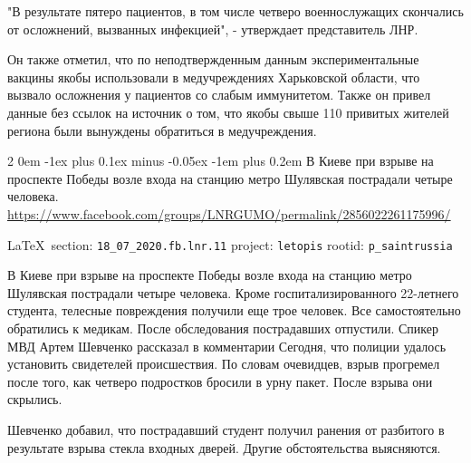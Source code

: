\documentclass[a4paper,11pt]{extreport}
\makeatletter
\renewcommand\subsection{%
  \clearpage
    \@startsection{subsection}%
    {2}%
    {0em}%
    {-1ex plus 0.1ex minus -0.05ex}%
    {-1em plus 0.2em}%
    {\scshape\bfseries\Large}%
}
\makeatother
\begin{document}
"В результате пятеро пациентов, в том числе четверо военнослужащих скончались
от осложнений, вызванных инфекцией", - утверждает представитель ЛНР.

Он также отметил, что по неподтвержденным данным экспериментальные вакцины
якобы использовали в медучреждениях Харьковской области, что вызвало осложнения
у пациентов со слабым иммунитетом. Также он привел данные без ссылок на
источник о том, что якобы свыше 110 привитых жителей региона были вынуждены
обратиться в медучреждения.
 
 
\subsection{В Киеве при взрыве на проспекте Победы возле входа на станцию метро Шулявская пострадали четыре человека.}
\label{sec:18_07_2020.fb.lnr.11}
\url{https://www.facebook.com/groups/LNRGUMO/permalink/2856022261175996/}
  
\vspace{0.5cm}
{\small\LaTeX~section: \verb|18_07_2020.fb.lnr.11| project: \verb|letopis| rootid: \verb|p_saintrussia|}
\vspace{0.5cm}


В Киеве при взрыве на проспекте Победы возле входа на станцию метро Шулявская
пострадали четыре человека. Кроме госпитализированного 22-летнего студента,
телесные повреждения получили еще трое человек. Все самостоятельно обратились
к медикам. После обследования пострадавших отпустили.  Спикер МВД Артем
Шевченко рассказал в комментарии Сегодня, что полиции удалось установить
свидетелей происшествия. По словам очевидцев, взрыв прогремел после того, как
четверо подростков бросили в урну пакет. После взрыва они скрылись.

Шевченко добавил, что пострадавший студент получил ранения от разбитого в результате взрыва стекла входных дверей. Другие обстоятельства выясняются. 
 
 
\end{document}
